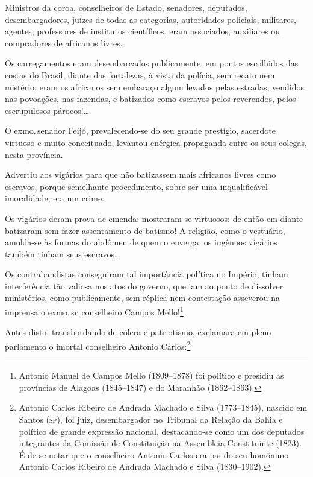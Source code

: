 {Ministros da coroa, conselheiros de Estado, senadores, deputados,
desembargadores, juízes de todas as categorias, autoridades policiais,
militares, agentes, professores de institutos científicos, eram
associados, auxiliares ou compradores de africanos livres.

Os carregamentos eram desembarcados publicamente, em pontos escolhidos
das costas do Brasil, diante das fortalezas, à vista da polícia, sem
recato nem mistério; eram os africanos sem embaraço algum levados pelas
estradas, vendidos nas povoações, nas fazendas, e batizados como
escravos pelos reverendos, pelos escrupulosos párocos!\ldots{}

O exmo.\,senador Feijó, prevalecendo-se do seu grande prestígio,
sacerdote virtuoso e muito conceituado, levantou enérgica propaganda
entre os seus colegas, nesta província.

Advertiu aos vigários para que não batizassem mais africanos livres como
escravos, porque semelhante procedimento, sobre ser uma inqualificável
imoralidade, era um crime.

Os vigários deram prova de emenda; mostraram-se virtuosos: de então em
diante batizaram sem fazer assentamento de batismo! A religião, como o
vestuário, amolda-se às formas do abdômen de quem o enverga: os ingênuos
vigários também tinham seus escravos\ldots{}

Os contrabandistas conseguiram tal importância política no Império,
tinham interferência tão valiosa nos atos do governo, que iam ao ponto
de dissolver ministérios, como publicamente, sem réplica nem contestação
asseverou na imprensa o exmo.\,sr.\,conselheiro Campos Mello!\footnote{ \label{mello}
  Antonio Manuel de Campos Mello (1809--1878) foi político e presidiu as
  províncias de Alagoas (1845--1847) e do Maranhão (1862--1863).}

Antes disto, transbordando de cólera e patriotismo, exclamara em pleno
parlamento o imortal conselheiro Antonio Carlos:\footnote{Antonio
  Carlos Ribeiro de Andrada Machado e Silva (1773--1845), nascido em
  Santos (\textsc{sp}), foi juiz, desembargador no Tribunal da Relação da Bahia e
  político de grande expressão nacional, destacando-se como um dos
  deputados integrantes da Comissão de Constituição na Assembleia
  Constituinte (1823). É de se notar que o conselheiro Antonio Carlos
  era pai do seu homônimo Antonio Carlos Ribeiro de Andrada Machado e
  Silva (1830--1902).}


}
